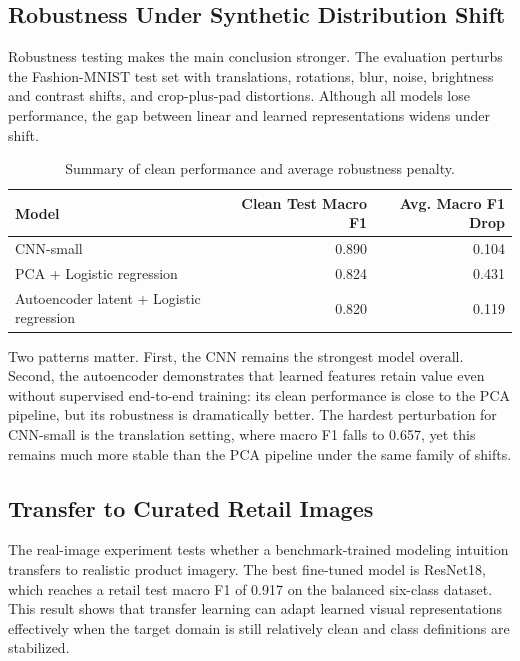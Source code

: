 \documentclass[11pt]{article}
\begin{document}
\subsection{Robustness Under Synthetic Distribution Shift}

Robustness testing makes the main conclusion stronger. The evaluation perturbs the Fashion-MNIST test set with translations, rotations, blur, noise, brightness and contrast shifts, and crop-plus-pad distortions. Although all models lose performance, the gap between linear and learned representations widens under shift.

\begin{table}[H]
\centering
\caption{Summary of clean performance and average robustness penalty.}
\label{tab:shift_results}
\begin{tabular}{lrr}
\toprule
Model & Clean Test Macro F1 & Avg. Macro F1 Drop \\
\midrule
CNN-small & 0.890 & 0.104 \\
PCA + Logistic regression & 0.824 & 0.431 \\
Autoencoder latent + Logistic regression & 0.820 & 0.119 \\
\bottomrule
\end{tabular}
\end{table}

Two patterns matter. First, the CNN remains the strongest model overall. Second, the autoencoder demonstrates that learned features retain value even without supervised end-to-end training: its clean performance is close to the PCA pipeline, but its robustness is dramatically better. The hardest perturbation for CNN-small is the translation setting, where macro F1 falls to 0.657, yet this remains much more stable than the PCA pipeline under the same family of shifts.

\subsection{Transfer to Curated Retail Images}

The real-image experiment tests whether a benchmark-trained modeling intuition transfers to realistic product imagery. The best fine-tuned model is ResNet18, which reaches a retail test macro F1 of 0.917 on the balanced six-class dataset. This result shows that transfer learning can adapt learned visual representations effectively when the target domain is still relatively clean and class definitions are stabilized.
\end{document}
